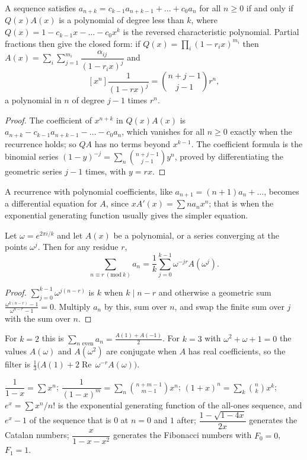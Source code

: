 \begin{theorem}
A sequence satisfies $a_{n+k}=c_{k-1}a_{n+k-1}+\dots+c_0a_n$ for all $n\ge0$ if and only if $Q(x)A(x)$ is a polynomial of degree less than $k$, where $Q(x)=1-c_{k-1}x-\dots-c_0x^k$ is the reversed characteristic polynomial. Partial fractions then give the closed form: if $Q(x)=\prod_i(1-r_ix)^{m_i}$ then $A(x)=\sum_i\sum_{j=1}^{m_i}\dfrac{\alpha_{ij}}{(1-r_ix)^j}$ and
\[
[x^n]\frac{1}{(1-rx)^j}=\binom{n+j-1}{j-1}r^n,
\]
a polynomial in $n$ of degree $j-1$ times $r^n$.
\end{theorem}

\begin{proof}
The coefficient of $x^{n+k}$ in $Q(x)A(x)$ is $a_{n+k}-c_{k-1}a_{n+k-1}-\dots-c_0a_n$, which vanishes for all $n\ge0$ exactly when the recurrence holds; so $QA$ has no terms beyond $x^{k-1}$. The coefficient formula is the binomial series $(1-y)^{-j}=\sum_n\binom{n+j-1}{j-1}y^n$, proved by differentiating the geometric series $j-1$ times, with $y=rx$.
\end{proof}

A recurrence with polynomial coefficients, like $a_{n+1}=(n+1)a_n+\dots$, becomes a differential equation for $A$, since $xA'(x)=\sum na_nx^n$; that is when the exponential generating function usually gives the simpler equation.

\begin{theorem}
Let $\omega=e^{2\pi i/k}$ and let $A(x)$ be a polynomial, or a series converging at the points $\omega^j$. Then for any residue $r$,
\[
\sum_{n\equiv r\ (\mathrm{mod}\ k)}a_n=\frac1k\sum_{j=0}^{k-1}\omega^{-jr}A(\omega^j).
\]
\end{theorem}

\begin{proof}
$\sum_{j=0}^{k-1}\omega^{j(n-r)}$ is $k$ when $k\mid n-r$ and otherwise a geometric sum $\frac{\omega^{k(n-r)}-1}{\omega^{n-r}-1}=0$. Multiply $a_n$ by this, sum over $n$, and swap the finite sum over $j$ with the sum over $n$.
\end{proof}

For $k=2$ this is $\sum_{n\text{ even}}a_n=\frac{A(1)+A(-1)}2$. For $k=3$ with $\omega^2+\omega+1=0$ the values $A(\omega)$ and $A(\omega^2)$ are conjugate when $A$ has real coefficients, so the filter is $\frac13\bigl(A(1)+2\operatorname{Re}\,\omega^{-r}A(\omega)\bigr)$.

\begin{lemma}
$\dfrac1{1-x}=\sum x^n$; $\dfrac{1}{(1-x)^{m}}=\sum_n\binom{n+m-1}{m-1}x^n$; $(1+x)^n=\sum_k\binom nkx^k$; $e^x=\sum x^n/n!$ is the exponential generating function of the all-ones sequence, and $e^x-1$ of the sequence that is $0$ at $n=0$ and $1$ after; $\dfrac{1-\sqrt{1-4x}}{2x}$ generates the Catalan numbers; $\dfrac{x}{1-x-x^2}$ generates the Fibonacci numbers with $F_0=0$, $F_1=1$.
\end{lemma}

